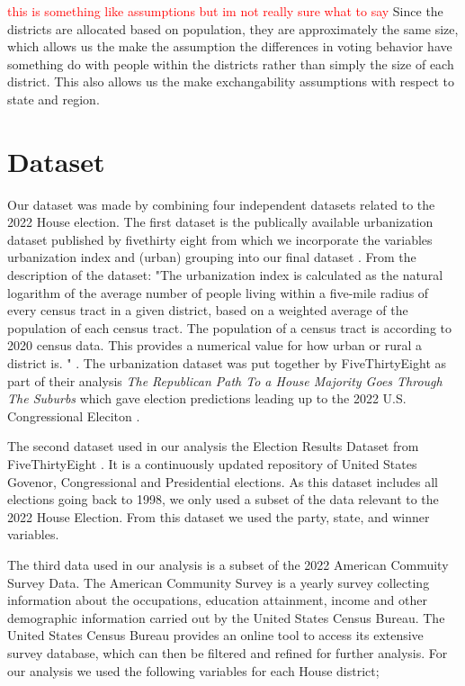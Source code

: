\documentclass[12pt]{article}
\begin{document}
\textcolor{red}{this is something like assumptions but im not really sure what to say}
Since the districts are allocated based on population, they are approximately the same size, which allows us the make the assumption the differences in voting behavior have something do with people within the districts rather than simply the size of each district. This also allows us the make exchangability assumptions with respect to state and region.




\section{Dataset}
Our dataset was made by combining four independent datasets related to the 2022 House election. The first dataset is the publically available urbanization dataset published by fivethirty eight from which we incorporate the variables urbanization index  and (urban) grouping into our final dataset \cite{urbanizationdataset}. From the description of the dataset: "The urbanization index is calculated as the natural logarithm of the average number of people living within a five-mile radius of every census tract in a given district, based on a weighted average of the population of each census tract. The population of a census tract is according to 2020 census data. This provides a numerical value for how urban or rural a district is. " \cite{urbanizationdataset}. The urbanization dataset was put together by FiveThirtyEight as part of their analysis  \textit{The Republican Path To a House Majority Goes Through The Suburbs} which gave election predictions leading up to the 2022 U.S. Congressional Eleciton \cite{538urbanizationarticle}. 

The second dataset used in our analysis the Election Results Dataset from FiveThirtyEight \cite{electionresultsdataset}. It is a continuously updated repository of United States Govenor, Congressional and Presidential elections. As this dataset includes all elections going back to 1998, we only used a subset of the data relevant to the 2022 House Election. From this dataset we used the party, state, and winner variables. 

The third data used in our analysis is a subset of the 2022 American Commuity Survey Data. The American Community Survey is a yearly survey collecting information about the occupations, education attainment, income and other demographic information carried out by the United States Census Bureau. The United States Census Bureau provides an online tool to access its extensive survey database, which can then be filtered and refined for further analysis. For our analysis we used the following variables for each House district; 
\end{document}
